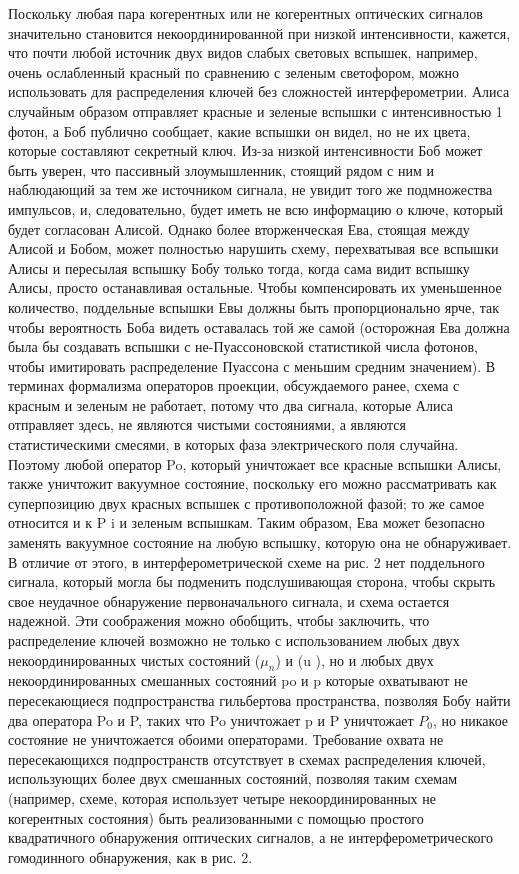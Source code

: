 Поскольку любая пара когерентных или не когерентных оптических сигналов значительно становится некоординированной при низкой интенсивности, кажется, что почти любой источник двух видов слабых световых вспышек, например, очень ослабленный красный по сравнению с зеленым светофором, можно использовать для распределения ключей без сложностей интерферометрии. Алиса случайным образом отправляет красные и зеленые вспышки с интенсивностью 1 фотон, а Боб публично сообщает, какие вспышки он видел, но не их цвета, которые составляют секретный ключ. Из-за низкой интенсивности Боб может быть уверен, что пассивный злоумышленник, стоящий рядом с ним и наблюдающий за тем же источником сигнала, не увидит того же подмножества импульсов, и, следовательно, будет иметь не всю информацию о ключе, который будет согласован  Алисой. 
Однако более вторженческая Ева, стоящая между Алисой и Бобом, может полностью нарушить схему, перехватывая все вспышки Алисы и пересылая вспышку Бобу только тогда, когда сама видит вспышку Алисы, просто останавливая остальные. Чтобы компенсировать их уменьшенное количество, поддельные вспышки Евы должны быть пропорционально ярче, так чтобы вероятность Боба видеть оставалась той же самой (осторожная Ева должна была бы создавать вспышки с не-Пуассоновской статистикой числа фотонов, чтобы имитировать распределение Пуассона с меньшим средним значением). В терминах формализма операторов проекции, обсуждаемого ранее, схема с красным и зеленым не работает, потому что два сигнала, которые Алиса отправляет здесь, не являются чистыми состояниями, а являются статистическими смесями, в которых фаза электрического поля случайна. Поэтому любой оператор Po, который уничтожает все красные вспышки Алисы, также уничтожит вакуумное состояние, поскольку его можно рассматривать как суперпозицию двух красных вспышек с противоположной фазой; то же самое относится и к P i и зеленым вспышкам. Таким образом, Ева может безопасно заменять вакуумное состояние на любую вспышку, которую она не обнаруживает. В отличие от этого, в интерферометрической схеме на рис. 2 нет поддельного сигнала, который могла бы подменить подслушивающая сторона, чтобы скрыть свое неудачное обнаружение первоначального сигнала, и схема остается надежной. Эти соображения можно обобщить, чтобы заключить, что распределение ключей возможно не только с использованием любых двух некоординированных чистых состояний ($\mu_n$) и (u ), но и любых двух некоординированных смешанных состояний po и p которые охватывают не пересекающиеся подпространства гильбертова пространства, позволяя Бобу найти два оператора Po и P, таких что Po уничтожает p и P уничтожает $P_0$, но никакое состояние не уничтожается обоими операторами. Требование охвата не пересекающихся подпространств отсутствует в схемах распределения ключей, использующих более двух смешанных состояний, позволяя таким схемам (например, схеме, которая использует четыре некоординированных не когерентных состояния) быть реализованными с помощью простого квадратичного обнаружения оптических сигналов, а не интерферометрического гомодинного обнаружения, как в рис. 2.

